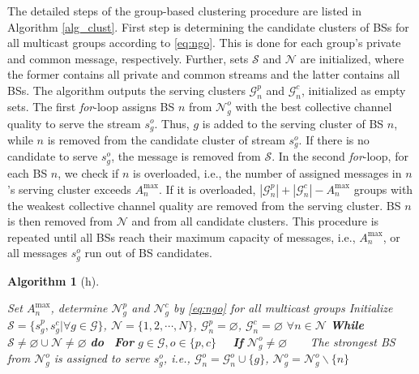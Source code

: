 \documentclass[12pt,draftcls,onecolumn]{IEEEtran}
\newtheorem{algorithm}{Algorithm}
\let\emptyset\varnothing
\theoremstyle{remark}
\let\emptyset\varnothing
\theoremstyle{definition}
\begin{document}
{%
The detailed steps of the group-based clustering procedure are listed in Algorithm \ref{alg_clust}. First step is determining the candidate clusters of BSs for all multicast groups according to \eqref{eq:ngo}. This is done for each group's private and common message, respectively. Further, sets $\mathcal{S}$ and $\mathcal{N}$ are initialized, where the former contains all private and common streams and the latter contains all BSs. The algorithm outputs the serving clusters $\mathcal{G}_n^p$ and $\mathcal{G}_n^c$, initialized as empty sets. The first \emph{for}-loop assigns BS $n$ from $\mathcal{N}_g^o$ with the best collective channel quality to serve the stream $s_g^o$. Thus, $g$ is added to the serving cluster of BS $n$, while $n$ is removed from the candidate cluster of stream $s_g^o$. If there is no candidate to serve $s_g^o$, the message is removed from $\mathcal{S}$. In the second \emph{for}-loop, for each BS $n$, we check if $n$ is overloaded, i.e., the number of assigned messages in $n$'s serving cluster exceeds $A_n^{\text{max}}$. If it is overloaded, $|\mathcal{G}_n^p|+|\mathcal{G}_n^c|-A_n^{\text{max}}$ groups with the weakest collective channel quality are removed from the serving cluster. BS $n$ is then removed from $\mathcal{N}$ and from all candidate clusters. This procedure is repeated until all BSs reach their maximum capacity of messages, i.e., $A_n^{\text{max}}$, or all messages $s_g^o$ run out of BS candidates. \\
\begin{algorithm}[h]
	\caption{Group-based Clustering Algorithm}
	\begin{spacing}{1}
		\begin{algorithmic}[1]
			\STATE Set $A_n^{\text{max}}$, determine $\mathcal{N}_g^p$ and $\mathcal{N}_g^c$ by \eqref{eq:ngo} for all multicast groups
			\STATE Initialize $\mathcal{S}=\{s_g^p,s_g^c|\forall g\in\mathcal{G}\}$, $\mathcal{N}=\{1,2,\cdots,N\}$, $\mathcal{G}_n^p = \emptyset$, $\mathcal{G}_n^c = \emptyset$ $\forall n\in\mathcal{N}$
			\STATE \textbf{While} $\mathcal{S}\neq\emptyset \cup \mathcal{N}\neq\emptyset$ \textbf{do} 
			\STATE $\;\;$\textbf{For} $g\in\mathcal{G}, o\in\{p,c\}$ 
			\STATE $\;\;$$\;\;$\textbf{If} $\mathcal{N}_g^o\neq\emptyset$ 
			\STATE $\;\;$$\;\;$$\;\;$The strongest BS from $\mathcal{N}_g^o$ is assigned to serve $s_g^o$, i.e., $\mathcal{G}_n^o = \mathcal{G}_n^o \cup \{g\}$, $\mathcal{N}_g^o = \mathcal{N}_g^o\backslash\{n\}$
$$
\end{algorithmic}
\end{spacing}
\end{algorithm}}
\end{document}
